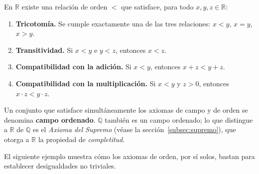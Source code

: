 \begin{theorem}\label{thm:orden}
En $\mathbb{R}$ existe una relación de orden $<$ que satisface, para todo
$x, y, z \in \mathbb{R}$:
\begin{enumerate}
   \item \textbf{Tricotomía.} Se cumple exactamente una de las tres relaciones:
         $x < y$, \; $x = y$, \; $x > y$.
   \item \textbf{Transitividad.} Si $x < y$ e $y < z$, entonces $x < z$.
   \item \textbf{Compatibilidad con la adición.} Si $x < y$, entonces
         $x + z < y + z$.
   \item \textbf{Compatibilidad con la multiplicación.} Si $x < y$ y $z > 0$,
         entonces $x \cdot z < y \cdot z$.
\end{enumerate}
\end{theorem}

\begin{rem}
Un conjunto que satisface simultáneamente los axiomas de campo y de orden se
denomina \textbf{campo ordenado}. $\mathbb{Q}$ también es un campo ordenado;
lo que distingue a $\mathbb{R}$ de $\mathbb{Q}$ es el \emph{Axioma del Supremo}
(véase la sección~\ref{subsec:supremo}), que otorga a $\mathbb{R}$ la propiedad
de \emph{completitud}.
\end{rem}

El siguiente ejemplo muestra cómo los axiomas de orden, por sí solos, bastan
para establecer desigualdades no triviales.

